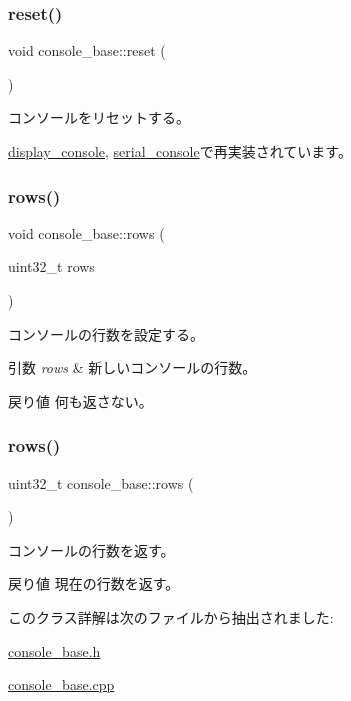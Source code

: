 \hypertarget{classconsole__base_a79693833fdcd6b83c6b9a18919355bb3}{}\label{classconsole__base_a79693833fdcd6b83c6b9a18919355bb3} 
\subsubsection{\texorpdfstring{reset()}{reset()}}
{\footnotesize\ttfamily void console\+\_\+base\+::reset (\begin{DoxyParamCaption}{ }\end{DoxyParamCaption})\hspace{0.3cm}{\ttfamily [virtual]}}

コンソールをリセットする。 

\hyperlink{classdisplay__console_af24f8d041c5ffb3b19ecec5521daad4a}{display\+\_\+console}, \hyperlink{classserial__console_a86f0ff28692c55debc2f39d3175fc52e}{serial\+\_\+console}で再実装されています。

\hypertarget{classconsole__base_aefdc51ef2ad888e5de55429e59ddb9a3}{}\label{classconsole__base_aefdc51ef2ad888e5de55429e59ddb9a3} 
\subsubsection{\texorpdfstring{rows()}{rows()}\hspace{0.1cm}{\footnotesize\ttfamily [1/2]}}
{\footnotesize\ttfamily void console\+\_\+base\+::rows (\begin{DoxyParamCaption}\item[{uint32\+\_\+t}]{rows }\end{DoxyParamCaption})}

コンソールの行数を設定する。 
\begin{DoxyParams}{引数}
{\em rows} & 新しいコンソールの行数。 \\
\hline
\end{DoxyParams}
\begin{DoxyReturn}{戻り値}
何も返さない。 
\end{DoxyReturn}
\hypertarget{classconsole__base_a6124ee0455ba292763d23cb137dc9929}{}\label{classconsole__base_a6124ee0455ba292763d23cb137dc9929} 
\subsubsection{\texorpdfstring{rows()}{rows()}\hspace{0.1cm}{\footnotesize\ttfamily [2/2]}}
{\footnotesize\ttfamily uint32\+\_\+t console\+\_\+base\+::rows (\begin{DoxyParamCaption}{ }\end{DoxyParamCaption})}

コンソールの行数を返す。 \begin{DoxyReturn}{戻り値}
現在の行数を返す。 
\end{DoxyReturn}


このクラス詳解は次のファイルから抽出されました\+:\begin{DoxyCompactItemize}
\item 
\hyperlink{console__base_8h}{console\+\_\+base.\+h}\item 
\hyperlink{console__base_8cpp}{console\+\_\+base.\+cpp}\end{DoxyCompactItemize}
